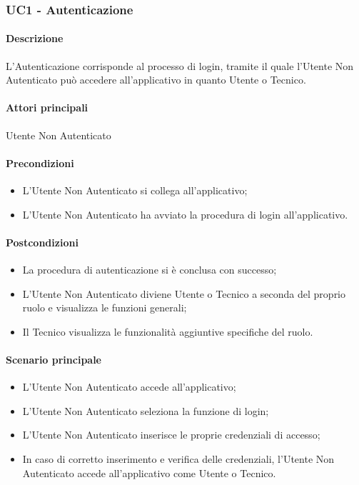 \subsubsection{UC1 - Autenticazione}\label{UC1}
\paragraph*{Descrizione}
L’Autenticazione corrisponde al processo di login, tramite il quale l’Utente Non Autenticato può accedere all’applicativo in quanto Utente o Tecnico.

\paragraph*{Attori principali}
Utente Non Autenticato

\paragraph*{Precondizioni}
\begin{itemize}
  \item L’Utente Non Autenticato si collega all’applicativo;
  \item L’Utente Non Autenticato ha avviato la procedura di login all’applicativo.  
\end{itemize}

\paragraph*{Postcondizioni}
\begin{itemize}
  \item La procedura di autenticazione si è conclusa con successo;
  \item L’Utente Non Autenticato diviene Utente o Tecnico a seconda del proprio ruolo e visualizza le funzioni generali;
  \item Il Tecnico visualizza le funzionalità aggiuntive specifiche del ruolo.  
\end{itemize}

\paragraph*{Scenario principale}
\begin{itemize}
  \item L’Utente Non Autenticato accede all’applicativo;
  \item L’Utente Non Autenticato seleziona la funzione di login;
  \item L’Utente Non Autenticato inserisce le proprie credenziali di accesso;
  \item In caso di corretto inserimento e verifica delle credenziali, l’Utente Non Autenticato accede all’applicativo come Utente o Tecnico.
\end{itemize}


